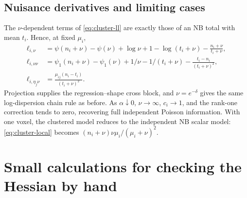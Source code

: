 \documentclass[11pt,a4paper]{article}
\numberwithin{equation}{section}
\begin{document}
\subsection{Nuisance derivatives and limiting cases}
The $\nu$-dependent terms of \eqref{eq:cluster-ll} are exactly those
of an NB total with mean $t_i$. Hence, at fixed $\mu_i$,
\begin{align}
 \ell_{i,\nu}
 &=\psi(n_i+\nu)-\psi(\nu)+\log\nu+1-\log(t_i+\nu)
                                    -\frac{n_i+\nu}{t_i+\nu},\\
 \ell_{i,\nu\nu}
 &=\psi_1(n_i+\nu)-\psi_1(\nu)+1/\nu-1/(t_i+\nu)
                                    -\frac{t_i-n_i}{(t_i+\nu)^2},\\
 \ell_{i,\eta_j\nu}&=\frac{\mu_{ij}(n_i-t_i)}{(t_i+\nu)^2}.
\end{align}
Projection supplies the regression--shape cross block, and
$\nu=e^{-\delta}$ gives the same log-dispersion chain rule as before.
As $\alpha\downarrow0$, $\nu\to\infty$, $c_i\to1$, and the rank-one
correction tends to zero, recovering full independent Poisson information.
With one voxel, the clustered model reduces to the independent NB
scalar model: \eqref{eq:cluster-local} becomes
$(n_i+\nu)\nu\mu_i/(\mu_i+\nu)^2$.

\section{Small calculations for checking the Hessian by hand}
\label{sec:hand}
\end{document}
